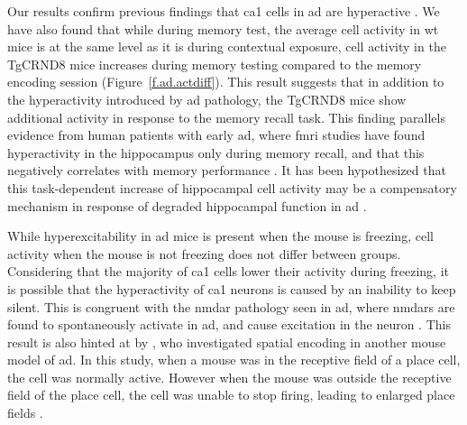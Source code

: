Our results confirm previous findings that \gls{ca1} cells in \gls{ad} are hyperactive \citep{palop16}. We have also found that while during memory test, the average cell activity in \gls{wt} mice is at the same level as it is during contextual exposure, cell activity in the TgCRND8 mice increases during memory testing compared to the memory encoding session (Figure~\ref{f.ad.actdiff}). This result suggests that in addition to the hyperactivity introduced by \gls{ad} pathology, the TgCRND8 mice show additional activity in response to the memory recall task. This finding parallels evidence from human patients with early \gls{ad}, where \gls{fmri} studies have found hyperactivity in the hippocampus only during memory recall, and that this negatively correlates with memory performance \citep{sperling09, reiman12, kunz15}. It has been hypothesized that this task-dependent increase of hippocampal cell activity may be a compensatory mechanism in response of degraded hippocampal function in \gls{ad} \citep{kunz15}.

While hyperexcitability in \gls{ad} mice is present when the mouse is freezing, cell activity when the mouse is not freezing does not differ between groups. Considering that the majority of \gls{ca1} cells lower their activity during freezing, it is possible that the hyperactivity of \gls{ca1} neurons is caused by an inability to keep silent. This is congruent with the \gls{nmdar} pathology seen in \gls{ad}, where \glspl{nmdar} are found to spontaneously activate in \gls{ad}, and cause excitation in the neuron \citep{danysz12}. This result is also hinted at by \citet{cheng13}, who investigated spatial encoding in another mouse model of \gls{ad}. In this study, when a mouse was in the receptive field of a place cell, the cell was normally active. However when the mouse was outside the receptive field of the place cell, the cell was unable to stop firing, leading to enlarged place fields \citep{cheng13}. 

